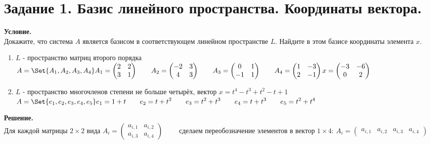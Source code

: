 \section{Задание 1. Базис линейного пространства. Координаты вектора.}

\textbf{Условие.}\\
Докажите, что система $A$ является базисом в соответствующем линейном пространстве $L$.
Найдите в этом базисе координаты элемента $x$.

\begin{enumerate}
    \item $L$ - пространство матриц второго порядка\\
    $\displaystyle A = \Set{A_1, A_2, A_3, A_4}\\
    A_1 = \begin{pmatrix}2 & 2 \\ 3 & 1\end{pmatrix}\qquad
    A_2 = \begin{pmatrix}-2 & 3 \\ 4 & 3\end{pmatrix}\qquad
    A_3 = \begin{pmatrix}0 & 1 \\ -1 & 1\end{pmatrix}\qquad
    A_4 = \begin{pmatrix}1 & -3 \\ 2 & -1\end{pmatrix}\\
    x = \begin{pmatrix}-3 & -6 \\ 0 & 2\end{pmatrix}$
    \item $L$ - пространство многочленов степени не больше четырёх, вектор $x = t^4 - t^3 + t^2 - t + 1$\\
    $\displaystyle A = \Set{e_1, e_2, e_3, e_4, e_5}\\
    e_1 = 1 + t\qquad
    e_2 = t + t^2\qquad
    e_3 = t^2 + t^3\qquad
    e_4 = t + t^3\qquad
    e_5 = t^2 + t^4\qquad$
\end{enumerate}
\vspace{10mm}
\noindent\textbf{Решение.}\\

Для каждой матрицы $2 \times 2$ вида
$A_i = \begin{pmatrix}a_{i, 1} & a_{i, 2} \\ a_{i, 3} & a_{i, 4}\end{pmatrix}\qquad$
сделаем переобозначение элементов в вектор $1 \times 4$:
$A_i = \begin{pmatrix}a_{i, 1} & a_{i,2} & a_{i,3} & a_{i,4}\end{pmatrix}$

